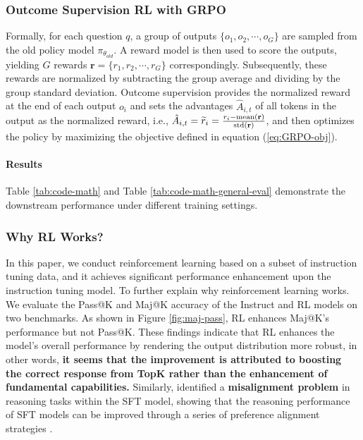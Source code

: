\begin{itemize}[topsep=0pt]
\subsubsection{Outcome Supervision RL with GRPO} Formally, for each question $q$,  a group of outputs $\{o_1, o_2, \cdots, o_G\}$  are sampled from the old policy model $\pi_{\theta_{old}}$. A reward model is then used to score the outputs, yielding $G$ rewards  $\mathbf{r}=\{r_1, r_2, \cdots, r_G\}$ correspondingly. Subsequently, these rewards are normalized by subtracting the group average and dividing by the group standard deviation. Outcome supervision provides the normalized reward at the end of each output $o_i$  and sets the advantages  $\hat{A}_{i, t}$  of all tokens in the output as the normalized reward, i.e., $\hat{A}_{i, t} = \widetilde{r}_i = \frac{r_i- {\rm mean}(\mathbf{r})}{{\rm std}(\mathbf{r})}$, and then optimizes the policy by maximizing the objective defined in equation (\ref{eq:GRPO-obj}).

\paragraph{Results}
Table \ref{tab:code-math} and Table \ref{tab:code-math-general-eval} demonstrate the downstream performance under different training settings.

\subsubsection{Why RL Works?} In this paper, we conduct reinforcement learning based on a subset of instruction tuning data, and it achieves significant performance enhancement upon the instruction tuning model. To further explain why reinforcement learning works. We evaluate the Pass@K and Maj@K accuracy of the Instruct and RL models on two benchmarks. As shown in Figure \ref{fig:maj-pass}, RL enhances Maj@K’s performance but not Pass@K. These findings indicate that RL enhances the model's overall performance by rendering the output distribution more robust, in other words, \textbf{it seems that the improvement is attributed to boosting the correct response from TopK rather than the enhancement of fundamental capabilities.} Similarly, \citep{wang2023making} identified a \textbf{misalignment problem} in reasoning tasks within the SFT model, showing that the reasoning performance of SFT models can be improved through a series of preference alignment strategies \citep{yuan2023rrhf,song2023preference,wang2023making}.


\end{itemize}
